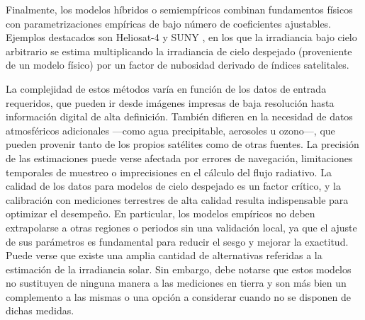 Finalmente, los modelos híbridos o semiempíricos combinan fundamentos físicos con parametrizaciones empíricas de bajo número de coeficientes ajustables. Ejemplos destacados son Heliosat-4 \cite{qu2017} y SUNY \cite{Perez2002}, en los que la irradiancia bajo cielo arbitrario se estima multiplicando la irradiancia de cielo despejado (proveniente de un modelo físico) por un factor de nubosidad derivado de índices satelitales.

La complejidad de estos métodos varía en función de los datos de entrada requeridos, que pueden ir desde imágenes impresas de baja resolución hasta información digital de alta definición. También difieren en la necesidad de datos atmosféricos adicionales —como agua precipitable, aerosoles u ozono—, que pueden provenir tanto de los propios satélites como de otras fuentes. La precisión de las estimaciones puede verse afectada por errores de navegación, limitaciones temporales de muestreo o imprecisiones en el cálculo del flujo radiativo. La calidad de los datos para modelos de cielo despejado es un factor crítico, y la calibración con mediciones terrestres de alta calidad resulta indispensable para optimizar el desempeño. En particular, los modelos empíricos no deben extrapolarse a otras regiones o periodos sin una validación local, ya que el ajuste de sus parámetros es fundamental para reducir el sesgo y mejorar la exactitud.\\




Puede verse que existe una amplia cantidad de alternativas referidas a la estimación de la irradiancia solar. Sin embargo, debe notarse que estos modelos no sustituyen de ninguna manera a las mediciones en tierra y son más bien un complemento a las mismas o una opción a considerar cuando no se disponen de dichas medidas. 

